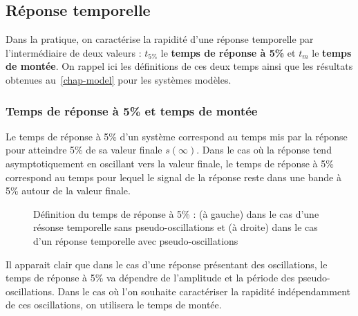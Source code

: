 \subsection{Réponse temporelle}
Dans la pratique, on caractérise la rapidité d'une réponse temporelle par 
l'intermédiaire de deux valeurs : $t_{5\%}$ le \textbf{temps de réponse à 5\%}
et $t_m$ le \textbf{temps de montée}. 
On rappel ici les définitions de ces deux temps ainsi que 
les résultats obtenues au~\cref{chap-model} pour les systèmes modèles.

\subsubsection{Temps de réponse à 5\% et temps de montée}

Le temps de réponse à 5\% d'un système correspond au temps mis par la réponse 
pour atteindre 5\% de sa valeur finale $s(\infty)$. Dans le cas où la réponse 
tend asymptotiquement en oscillant vers la valeur finale, le temps de
réponse à 5\% correspond au temps pour lequel le signal de la réponse reste
dans une bande à 5\% autour de la valeur finale. 

\begin{figure}[!h]
    \centering
    
    
    \caption{Définition du temps de réponse à 5\% : (à gauche) dans le cas
             d'une résonse temporelle sans pseudo-oscillations et (à droite) 
             dans le cas d'un réponse temporelle avec pseudo-oscillations}
\end{figure}

Il apparait clair que dans le cas d'une réponse présentant des oscillations,
le temps de réponse à 5\% va dépendre de l'amplitude et la période des 
pseudo-oscillations. Dans le cas où l'on souhaite caractériser la rapidité
indépendamment de ces oscillations, on utilisera le temps de montée.

